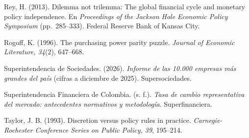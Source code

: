 Rey, H. (2013). Dilemma not trilemma: The global financial cycle and
monetary policy independence. En \emph{Proceedings of the Jackson Hole
Economic Policy Symposium} (pp.~285--333). Federal Reserve Bank of
Kansas City.

Rogoff, K. (1996). The purchasing power parity puzzle. \emph{Journal of
Economic Literature, 34}(2), 647--668.

Superintendencia de Sociedades. (2026). \emph{Informe de las 10.000
empresas más grandes del país} (cifras a diciembre de 2025).
Supersociedades.

Superintendencia Financiera de Colombia. (s. f.). \emph{Tasa de cambio
representativa del mercado: antecedentes normativos y metodología}.
Superfinanciera.

Taylor, J. B. (1993). Discretion versus policy rules in practice.
\emph{Carnegie-Rochester Conference Series on Public Policy, 39},
195--214.
